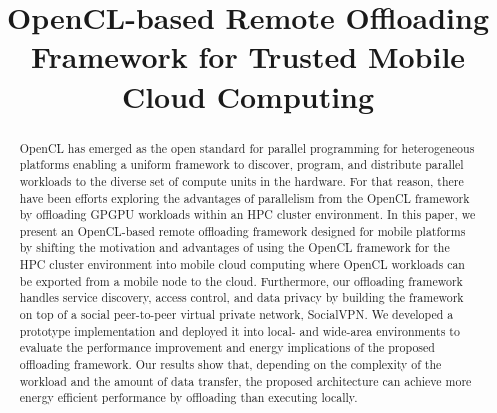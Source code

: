 \documentclass[10pt, conference, compsocconf]{IEEEtran}
\begin{document}


\title{OpenCL-based Remote Offloading Framework for Trusted Mobile
Cloud Computing}


\author{
\and
{}
}

\maketitle

\begin{abstract}
%
OpenCL has emerged as the open standard for parallel programming for
heterogeneous platforms enabling a uniform framework to discover,
program, and distribute parallel workloads to the diverse set of compute
units in the hardware.
%
For that reason, there have been efforts exploring the advantages of
parallelism from the OpenCL framework by offloading GPGPU workloads
within an HPC cluster environment.
%
In this paper, we present an OpenCL-based remote offloading framework
designed for mobile platforms by shifting the motivation and
advantages of using the OpenCL framework for the HPC cluster environment
into mobile cloud computing where OpenCL workloads can be exported from
a mobile node to the cloud.
%
Furthermore, our offloading framework handles service discovery, access
control, and data privacy by building the framework on top of a social
peer-to-peer virtual private network, SocialVPN. 
%
We developed a prototype implementation and deployed it into local- and
wide-area environments to evaluate the performance improvement and
energy implications of the proposed offloading framework.
%
Our results show that, depending on the complexity of the workload and
the amount of data transfer, the proposed architecture can achieve more
energy efficient performance by offloading than executing locally.
\end{abstract}
\end{document}
